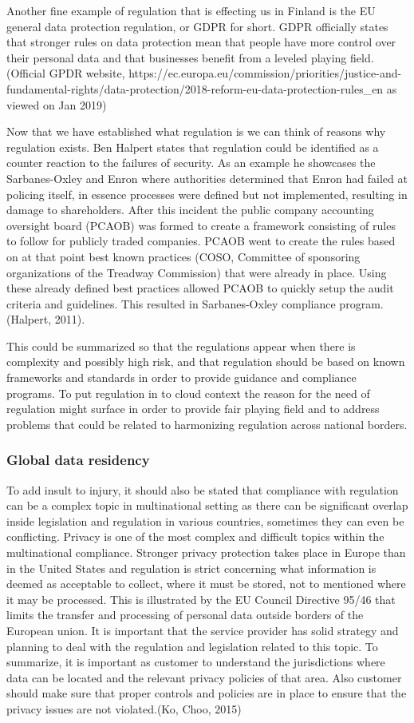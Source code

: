 \documentclass{article}
\begin{document}
Another fine example of regulation that is effecting us in Finland is the EU general data protection regulation, or GDPR for short. GDPR officially states that stronger rules on data protection mean that people have more control over their personal data and that businesses benefit from a leveled playing field. (Official GPDR website, https://ec.europa.eu/commission/priorities/justice-and-fundamental-rights/data-protection/2018-reform-eu-data-protection-rules\_en as viewed on Jan 2019)
\par
Now that we have established what regulation is we can think of reasons why regulation exists. Ben Halpert states that regulation could be identified as a counter reaction to the failures of security. As an example he showcases the Sarbanes-Oxley and Enron where authorities determined that Enron had failed at policing itself, in essence processes were defined but not implemented, resulting in damage to shareholders. After this incident the public company accounting oversight board (PCAOB) was formed to create a framework consisting of rules to follow for publicly traded companies.
PCAOB went to create the rules based on at that point best known practices (COSO, Committee of sponsoring organizations of the Treadway Commission) that were already in place. Using these already defined best practices allowed PCAOB to quickly setup the audit criteria and guidelines. This resulted in Sarbanes-Oxley compliance program.(Halpert, 2011).
\par
This could be summarized so that the regulations appear when there is complexity and possibly high risk, and that regulation should be based on known frameworks and standards in order to provide guidance and compliance programs.
To put regulation in to cloud context the reason for the need of regulation might surface in order to provide fair playing field and to address problems that could be related to harmonizing regulation across national borders.
\subsubsection{Global data residency}
To add insult to injury, it should also be stated that compliance with regulation can be a complex topic in multinational setting as there can be significant overlap inside legislation and regulation in various countries, sometimes they can even be conflicting. Privacy is one of the most complex and difficult topics within the multinational compliance. Stronger privacy protection takes place in Europe than in the United States and regulation is strict concerning what information is deemed as acceptable to collect, where it must be stored, not to mentioned where it may be processed. This is illustrated by the EU Council Directive 95/46 that limits the transfer and processing of personal data outside borders of the European union. It is important that the service provider has solid strategy and planning to deal with the regulation and legislation related to this topic. To summarize, it is important as customer to understand the jurisdictions where data can be located and the relevant privacy policies of that area. Also customer should make sure that proper controls and policies are in place to ensure that the privacy issues are not violated.(Ko, Choo, 2015)
\end{document}

